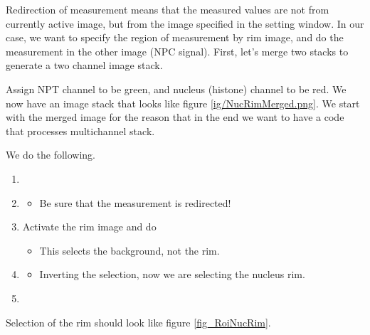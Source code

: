 Redirection of measurement means that the measured values are not from currently active image, but from the image specified in the setting window. In our case, we want to specify the region of measurement by rim image, and do the measurement in the other image (NPC signal). First, let's merge two stacks to generate a two channel image stack. 


Assign NPT channel to be green, and nucleus (histone) channel to be red. We now have an image stack that looks like figure \ref{ig/NucRimMerged.png}. We start with the merged image for the reason that in the end we want to have a code that processes multichannel stack. 


We do the following. 

\begin{enumerate}
  \item {}
  \item {}
  \begin{itemize}
    \item Be sure that the measurement is redirected!
  \end{itemize}
  \item Activate the rim image and do 
  \begin{itemize}
    \item This selects the background, not the rim. 
  \end{itemize}
  \item {}
  \begin{itemize}
    \item Inverting the selection, now we are selecting the nucleus rim. 
  \end{itemize}
  \item {}
\end{enumerate}

Selection of the rim should look like figure \ref{fig_RoiNucRim}.

